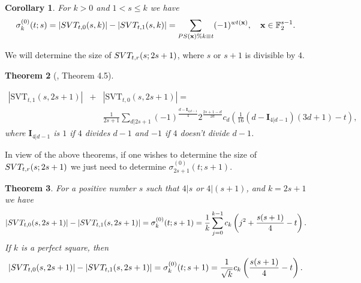 \documentclass[12pt]{article}
\newtheorem{thm}{Theorem}[subsection]%
\newtheorem{cor}[thm]{Corollary}%
\begin{document}
\begin{cor} For $k>0$ and $1< s\leq k$ we have 
$$
\sigma_{k}^{(0)}(t;s)=|\textnormal{SVT}_{t,0}(s,k)|-|\textnormal{SVT}_{t,1}(s,k)|=\sum_{\textnormal{PS}(\mathbf{x})\%k\equiv t}(-1)^{\textnormal{wt}(\mathbf{x})},\quad  \mathbf{x}\in \mathbb{F}_{2}^{s-1}.
$$   
\end{cor}


We will determine the size of $\textnormal{SVT}_{t,r}(s;2s+1)$, where $s$ or $s+1$ is divisible by $4$. 

\begin{thm}[\cite{bibak1}, Theorem 4.5]\label{sum}

\begin{eqnarray}
 \nonumber |\text{SVT}_{t,1}(s,2s+1)|&+&|\text{SVT}_{t,0}(s,2s+1)|  =  \\
 \nonumber && \frac{1}{2s+1}\sum_{d|2s+1}(-1)^{\frac{d-\textbf{I}_{4|d-1}}{4}}2^{\frac{2s+1-d}{2d}}c_{d}\left(\frac{1}{16}(d-\textbf{I}_{4|d-1})(3d+1)-t\right),
\end{eqnarray}
where $\textbf{I}_{4|d-1}$ is $1$ if $4$ divides $d-1$ and $-1$ if $4$ doesn't divide $d-1$.
\end{thm}

In view of the above theorems, if one wishes to determine the size of $\textnormal{SVT}_{t,r}(s;2s+1)$ we just need to determine $\sigma^{(0)}_{2s+1}(t;s+1)$.

\begin{thm} \label{difference}
For a positive number $s$ such that $4|s$ or $4|(s+1)$, and $k=2s+1$ we have 
$$
|\textnormal{SVT}_{t,0}(s,2s+1)|-|\textnormal{SVT}_{t,1}(s,2s+1)|=\sigma^{(0)}_{k}(t;s+1)=\frac{1}{k}\sum_{j=0}^{k-1}c_{k}\left(j^{2}+\frac{s(s+1)}{4}-t\right).
$$
If $k$ is a perfect square, then 
$$
|\textnormal{SVT}_{t,0}(s,2s+1)|-|\textnormal{SVT}_{t,1}(s,2s+1)|=\sigma_{k}^{(0)}(t;s+1)=\frac{1}{\sqrt{k}}c_{k}\left(\frac{s(s+1)}{4}-t\right).
$$
\end{thm}
\end{document}
